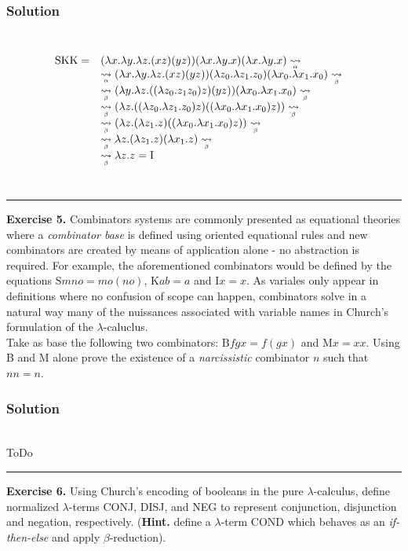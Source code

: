 \documentclass{article}
\newcommand\stcarrow[2]{%
    \mathrel{\stackunder[2pt]{\stackon[4pt]{$\rightsquigarrow$}{$\scriptscriptstyle#1$}}{%
            $\scriptscriptstyle#2$}}}
\newcommand{\ar}[1]{\stcarrow{}{\alpha}#1}
\newcommand{\br}[1]{\stcarrow{}{\beta}#1}
\newcommand{\lm}[1]{\lambda #1 .}
\newcommand{\qed}{\begin{flushright}\rule{0.7em}{0.7em}\end{flushright}}
\begin{document}
\subsubsection*{Solution} \\
\begin{equation*}
\begin{array}{rll}
      \text{SKK} =  & (\lm{x}\lm{y}\lm{z}(x z)(y z))(\lm{x}\lm{y}x)(\lm{x}\lm{y}x) \ar{} & \\
                    & \ar{(\lm{x}\lm{y}\lm{z}(x z)(y z))(\lm{z_0}\lm{z_1}z_0)(\lm{x_0}\lm{x_1}x_0)} \br{}& \\
                    & \br{(\lm{y}\lm{z}((\lm{z_0}z_1 z_0)z)(yz))(\lm{x_0}\lm{x_1}x_0)} \br{}& \\
                    & \br{(\lm{z}((\lm{z_0}\lm{z_1} z_0)z)((\lm{x_0}\lm{x_1}x_0)z))} \br{}& \\
                    & \br{(\lm{z}(\lm{z_1} z)((\lm{x_0}\lm{x_1}x_0)z))} \br{} & \\
                    & \br{\lm{z}(\lm{z_1}z)(\lm{x_1}z)} \br{} & \\
                    & \br{\lm{z}z} = \text{I} & \\
\end{array}
\end{equation*}\\
\qed
\textbf{Exercise 5.} Combinators systems are commonly presented as equational theories where a \textit{combinator base} is defined using oriented equational rules and new combinators are created by means of application alone - no abstraction is required. For example, the aforementioned combinators would be defined by the equations $\text{S}mno = mo(no)$, $\text{K}ab = a$ and $\text{I}x = x$. As variales only appear in definitions where no confusion of scope can happen, combinators solve in a natural way many of the nuissances associated with variable names in Church's formulation of the $\lambda$-caluclus.\\

Take as base the following two combinators: $\text{B}f g x = f(g x)$ and $\text{M}x = xx$. Using B and M alone prove the existence of a \textit{narcissistic} combinator $n$ such that $nn=n$.
\subsubsection*{Solution} \\
ToDo
\qed
\textbf{Exercise 6.} Using Church's encoding of booleans in the pure $\lambda$-calculus, define normalized $\lambda$-terms CONJ, DISJ, and NEG to represent conjunction, disjunction and negation, respectively. (\textbf{Hint.} define a $\lambda$-term COND which behaves as an \textit{if-then-else} and apply $\beta$-reduction).
\end{document}
